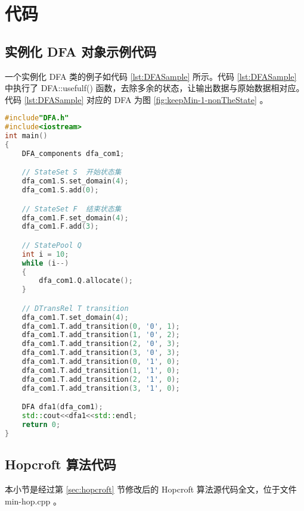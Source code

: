 \chapter{代码}

\section{实例化 DFA 对象示例代码}

一个实例化 DFA 类的例子如代码 \ref{lst:DFASample} 所示。代码 \ref{lst:DFASample} 中执行了 DFA::usefulf() 函数，去除多余的状态，让输出数据与原始数据相对应。代码 \ref{lst:DFASample} 对应的 DFA 为图 \ref{fig:keepMin-1-nonTheState} 。


\lstset{style=mystyle}
\begin{lstlisting}[language=C++,label={lst:DFASample},caption={实例化DFA示例}]
#include"DFA.h"
#include<iostream>
int main()
{
    DFA_components dfa_com1;

    // StateSet S  开始状态集
    dfa_com1.S.set_domain(4);
    dfa_com1.S.add(0);

    // StateSet F  结束状态集
    dfa_com1.F.set_domain(4);
    dfa_com1.F.add(3);

    // StatePool Q 
    int i = 10;
    while (i--)
    {
        dfa_com1.Q.allocate();
    }

    // DTransRel T transition             
    dfa_com1.T.set_domain(4);
    dfa_com1.T.add_transition(0, '0', 1);
    dfa_com1.T.add_transition(1, '0', 2);
    dfa_com1.T.add_transition(2, '0', 3);
    dfa_com1.T.add_transition(3, '0', 3);
    dfa_com1.T.add_transition(0, '1', 0);
    dfa_com1.T.add_transition(1, '1', 0);
    dfa_com1.T.add_transition(2, '1', 0);
    dfa_com1.T.add_transition(3, '1', 0);

    DFA dfa1(dfa_com1);
    std::cout<<dfa1<<std::endl;
    return 0;
}
\end{lstlisting}

\section{Hopcroft 算法代码}

本小节是经过第 \ref{sec:hopcroft} 节修改后的 Hopcroft 算法源代码全文，位于文件 min-hop.cpp 。

